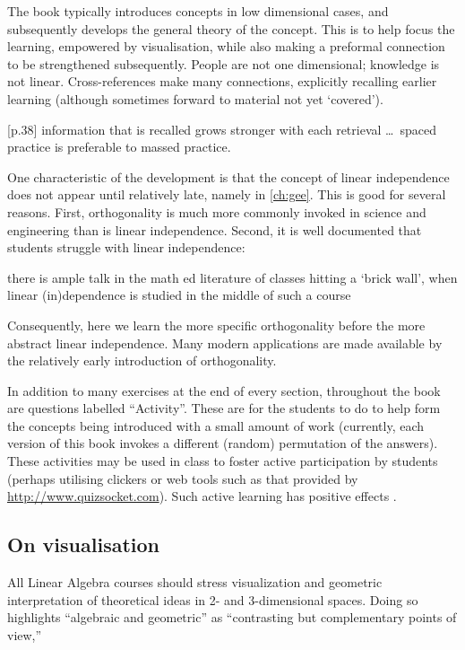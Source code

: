 The book typically introduces concepts in low dimensional cases, and subsequently develops the general theory of the concept.  
This is to help focus the learning, empowered by visualisation, while also making a preformal connection to be strengthened subsequently.
People are not one dimensional; knowledge is not linear.
Cross-references make many connections, explicitly recalling earlier learning (although sometimes forward to material not yet `covered').
\begin{quoted}{\cite{Halpern2003} [p.38]}
information that is recalled grows stronger with each retrieval \ldots\ spaced practice is preferable to massed practice.
\end{quoted}

One characteristic of the development is that the concept of linear independence does not appear until relatively late, namely in \autoref{ch:gee}.
This is good for several reasons.
First, orthogonality is much more commonly invoked in science and engineering than is linear independence.
Second, it is well documented that students struggle with linear independence:
\begin{quoted}{\cite{Uhlig02}}
there is ample talk in the math ed literature of classes hitting a `brick wall', when linear (in)dependence is studied in the middle of such a course
\end{quoted}
Consequently, here we learn the more specific orthogonality before the more abstract linear independence.
Many modern applications are made available by the relatively early introduction of orthogonality.

In addition to many exercises at the end of every section, throughout the book are questions labelled ``Activity''.
These are for the students to do to help form the concepts being introduced with a small amount of work (currently, each version of this book invokes a different (random) permutation of the answers).
These activities may be used in class to foster active participation by students (perhaps utilising clickers or web tools such as that provided by \url{http://www.quizsocket.com}).
Such active learning has positive effects \cite[]{ED498555}.




\subsection*{On visualisation}

\begin{quoted}{\cite[p.38]{CUPMguide2015}}
All Linear Algebra courses should stress visualization and geometric interpretation of theoretical ideas in 2- and 3-dimensional spaces. Doing so highlights ``algebraic and geometric'' as ``contrasting but complementary points of view,''
\end{quoted}


